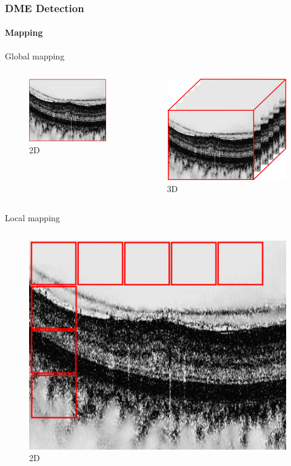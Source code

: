 \documentclass{beamer}
\begin{document}
\begin{frame}
  \frametitle{DME Detection}
  \framesubtitle{Mapping}
  \begin{block}{Global mapping}
    \begin{columns}
      \begin{column}{.5\linewidth}
        \begin{figure}
          \centering
          \includegraphics[width=.3\textwidth]{./images/global-2d.png}
          \caption{2D}
        \end{figure}
      \end{column}
      \begin{column}{.5\linewidth}
        \begin{figure}
          \centering
          \includegraphics[width=.3\textwidth]{./images/global-3d.png}
          \caption{3D}
        \end{figure}
      \end{column}
    \end{columns}
  \end{block}
  \begin{block}{Local mapping}
    \begin{columns}
      \begin{column}{.5\linewidth}
        \begin{figure}
          \centering
          \includegraphics[width=.3\textwidth]{./images/local-2d.png}
          \caption{2D}
        \end{figure}

\end{column}
\end{columns}
\end{block}
\end{frame}
\end{document}
